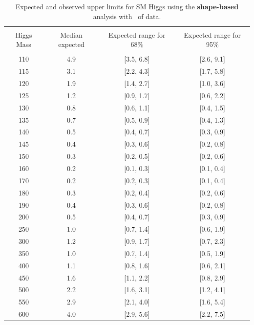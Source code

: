 \begin{table}[hbp!]
\begin{center}
\begin{tabular}{c c c c}
\hline
\vspace{-3mm} && \\
 Higgs Mass   & Median expected & Expected range for 68\% & Expected range for 95\%   \\
\vspace{-3mm} && \\
\hline
110 & 4.9 & [3.5, 6.8] & [2.6, 9.1] \\
115 & 3.1 & [2.2, 4.3] & [1.7, 5.8] \\
120 & 1.9 & [1.4, 2.7] & [1.0, 3.6] \\
125 & 1.2 & [0.9, 1.7] & [0.6, 2.2] \\
130 & 0.8 & [0.6, 1.1] & [0.4, 1.5] \\
135 & 0.7 & [0.5, 0.9] & [0.4, 1.3] \\
140 & 0.5 & [0.4, 0.7] & [0.3, 0.9] \\
145 & 0.4 & [0.3, 0.6] & [0.2, 0.8] \\
150 & 0.3 & [0.2, 0.5] & [0.2, 0.6] \\
160 & 0.2 & [0.1, 0.3] & [0.1, 0.4] \\
170 & 0.2 & [0.2, 0.3] & [0.1, 0.4] \\
180 & 0.3 & [0.2, 0.4] & [0.2, 0.6] \\
190 & 0.4 & [0.3, 0.6] & [0.2, 0.8] \\
200 & 0.5 & [0.4, 0.7] & [0.3, 0.9] \\
250 & 1.0 & [0.7, 1.4] & [0.6, 1.9] \\
300 & 1.2 & [0.9, 1.7] & [0.7, 2.3] \\
350 & 1.0 & [0.7, 1.4] & [0.5, 1.9] \\
400 & 1.1 & [0.8, 1.6] & [0.6, 2.1] \\
450 & 1.6 & [1.1, 2.2] & [0.8, 2.9] \\
500 & 2.2 & [1.6, 3.1] & [1.2, 4.1] \\
550 & 2.9 & [2.1, 4.0] & [1.6, 5.4] \\
600 & 4.0 & [2.9, 5.6] & [2.2, 7.5] \\
\hline
\end{tabular}
\caption{Expected and observed upper limits for SM Higgs using the
  {\bf shape-based} analysis with \intlumiEightTeV\ of data.}
\label{tab:mvabase_uls}
\end{center}
\end{table}
